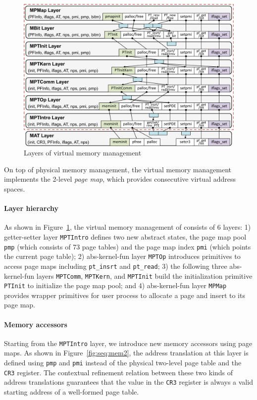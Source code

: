 \begin{figure}\centering
\includegraphics[scale=0.5]{figs/vmm_layer}	
\caption{Layers of virtual memory management}
\label{fig:base:vmm:layers}
\hrulefill
\end{figure}

On top of physical memory management,
the virtual memory management implements
the 2-level \emph{page map}, which
provides consecutive virtual address spaces.

\paragraph{Layer hierarchy}
As shown in
Figure~\ref{fig:base:vmm:layers}, the virtual memory management of
\mCTOSbase{} consists of 6 layers: 1) getter-setter layer \verb"MPTIntro"
defines two new abstract states, the page map pool \verb"pmp" (which
consists of 73 page tables) and the page map index \verb"pmi" (which
points the current page table); 
2) abs-kernel-fun layer \verb"MPTOp"
introduces primitives to access page maps including \verb"pt_insrt" and
\verb"pt_read"; 3) the following three abs-kernel-fun layers
\verb"MPTComm", \verb"MPTKern", and \verb"MPTInit" build the
initialization primitive \verb"PTInit" to initialize the page map pool;
and 4) abs-kernel-fun layer \verb"MPMap" 
provides wrapper primitives
for user process to allocate a page and insert to its page map.

\paragraph{Memory accessors}
Starting from the \verb"MPTIntro" layer, we 
introduce new memory accessors
using page maps.
As shown in Figure~\ref{fig:seq:mem2},
the
address translation at this layer is defined
using \verb"pmp" and \verb"pmi" instead of the physical two-level page
table and the \verb"CR3" register.  The contextual refinement relation
between these two kinds of address translations guarantees that the
value in the \verb"CR3" register is always a valid starting address of
a well-formed page table.

